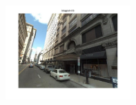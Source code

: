         \vspace{3mm}
        \\
        \begin{minipage}{0.34\linewidth}
            \centering
            \vspace{0mm}
            \includegraphics[trim = 45mm 40mm 45mm 30mm, clip=true, height=36mm]{imgs/Pval/exMix19/query.jpg}
        \end{minipage}
